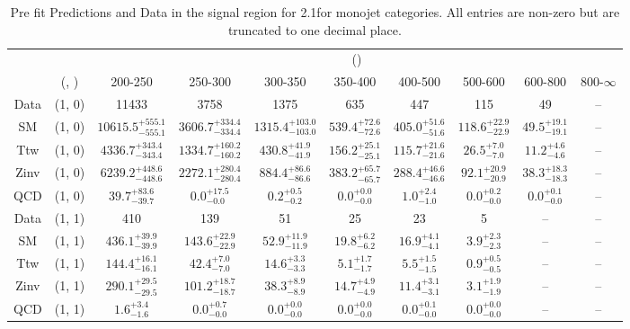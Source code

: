 \begin{table}[h!]
\tiny
\centering
\caption{Pre fit Predictions and Data in the signal region for 2.1\ifb for monojet categories. All entries are non-zero but are truncated to one decimal place.\label{tab:predallqcd_sig_comb_mono}}
\begin{tabular}
{cccccccccc}
	\hline\hline
	&	& \multicolumn{8}{c}{\scalht (\gev)}\\ 
	&	 (\njet, \nb) & 200-250 & 250-300 & 300-350 & 350-400 & 400-500 & 500-600 & 600-800 & 800-$\infty$ \\ [0.8ex] 
\hline
	Data & (1, 0) & 11433 & 3758 & 1375 & 635 & 447 & 115 & 49 & -- \\[0.5ex] 
	SM & (1, 0) & $10615.5^{+ 555.1 }_{- 555.1 }$ & $3606.7^{+ 334.4 }_{- 334.4 }$ & $1315.4^{+ 103.0 }_{- 103.0 }$ & $539.4^{+ 72.6 }_{- 72.6 }$ & $405.0^{+ 51.6 }_{- 51.6 }$ & $118.6^{+ 22.9 }_{- 22.9 }$ & $49.5^{+ 19.1 }_{- 19.1 }$ & -- \\[0.5ex] 
	Ttw & (1, 0) & $4336.7^{+ 343.4 }_{- 343.4 }$ & $1334.7^{+ 160.2 }_{- 160.2 }$ & $430.8^{+ 41.9 }_{- 41.9 }$ & $156.2^{+ 25.1 }_{- 25.1 }$ & $115.7^{+ 21.6 }_{- 21.6 }$ & $26.5^{+ 7.0 }_{- 7.0 }$ & $11.2^{+ 4.6 }_{- 4.6 }$ & -- \\[0.5ex] 
	Zinv & (1, 0) & $6239.2^{+ 448.6 }_{- 448.6 }$ & $2272.1^{+ 280.4 }_{- 280.4 }$ & $884.4^{+ 86.6 }_{- 86.6 }$ & $383.2^{+ 65.7 }_{- 65.7 }$ & $288.4^{+ 46.6 }_{- 46.6 }$ & $92.1^{+ 20.9 }_{- 20.9 }$ & $38.3^{+ 18.3 }_{- 18.3 }$ & -- \\[0.5ex] 
	QCD & (1, 0) & $39.7^{+ 83.6 }_{- 39.7 }$ & $0.0^{+ 17.5 }_{- 0.0 }$ & $0.2^{+ 0.5 }_{- 0.2 }$ & $0.0^{+ 0.0 }_{- 0.0 }$ & $1.0^{+ 2.4 }_{- 1.0 }$ & $0.0^{+ 0.2 }_{- 0.0 }$ & $0.0^{+ 0.1 }_{- 0.0 }$ & -- \\[0.5ex] 
	Data & (1, 1) & 410 & 139 & 51 & 25 & 23 & 5 & -- & -- \\[0.5ex] 
	SM & (1, 1) & $436.1^{+ 39.9 }_{- 39.9 }$ & $143.6^{+ 22.9 }_{- 22.9 }$ & $52.9^{+ 11.9 }_{- 11.9 }$ & $19.8^{+ 6.2 }_{- 6.2 }$ & $16.9^{+ 4.1 }_{- 4.1 }$ & $3.9^{+ 2.3 }_{- 2.3 }$ & -- & -- \\[0.5ex] 
	Ttw & (1, 1) & $144.4^{+ 16.1 }_{- 16.1 }$ & $42.4^{+ 7.0 }_{- 7.0 }$ & $14.6^{+ 3.3 }_{- 3.3 }$ & $5.1^{+ 1.7 }_{- 1.7 }$ & $5.5^{+ 1.5 }_{- 1.5 }$ & $0.9^{+ 0.5 }_{- 0.5 }$ & -- & -- \\[0.5ex] 
	Zinv & (1, 1) & $290.1^{+ 29.5 }_{- 29.5 }$ & $101.2^{+ 18.7 }_{- 18.7 }$ & $38.3^{+ 8.9 }_{- 8.9 }$ & $14.7^{+ 4.9 }_{- 4.9 }$ & $11.4^{+ 3.1 }_{- 3.1 }$ & $3.1^{+ 1.9 }_{- 1.9 }$ & -- & -- \\[0.5ex] 
	QCD & (1, 1) & $1.6^{+ 3.4 }_{- 1.6 }$ & $0.0^{+ 0.7 }_{- 0.0 }$ & $0.0^{+ 0.0 }_{- 0.0 }$ & $0.0^{+ 0.0 }_{- 0.0 }$ & $0.0^{+ 0.1 }_{- 0.0 }$ & $0.0^{+ 0.0 }_{- 0.0 }$ & -- & -- \\[0.5ex] 
	\hline
	\hline
\end{tabular}
\end{table}

